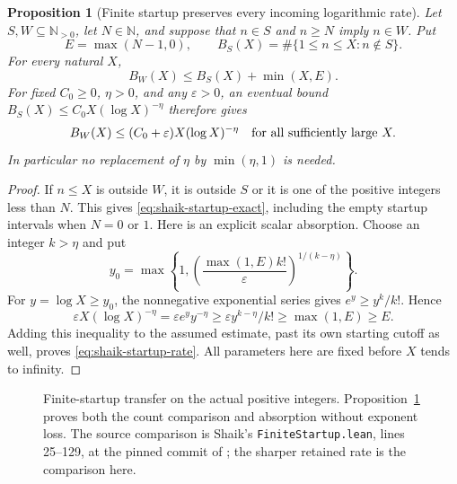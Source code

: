 \documentclass[11pt]{article}
\newtheorem{proposition}{Proposition}
\theoremstyle{remark}\newtheorem{remark}[proposition]{Remark}
\begin{document}
\begin{proposition}[Finite startup preserves every incoming logarithmic rate]
\label{prop:shaik-startup-rate}
Let \(S,W\subseteq\mathbb N_{>0}\), let \(N\in\mathbb N\), and suppose
that \(n\in S\) and \(n\ge N\) imply \(n\in W\). Put
\[
 E=\max(N-1,0),\qquad
 B_S(X)=\#\{1\le n\le X:n\notin S\}.
\]
For every natural \(X\),
\begin{equation}\label{eq:shaik-startup-exact}
 B_W(X)\le B_S(X)+\min(X,E).
\end{equation}
For fixed \(C_0\ge0\), \(\eta>0\), and any \(\varepsilon>0\), an
eventual bound \(B_S(X)\le C_0X(\log X)^{-\eta}\) therefore gives
\begin{equation}\label{eq:shaik-startup-rate}
 B_W(X)\le(C_0+\varepsilon)X(\log X)^{-\eta}
 \quad\hbox{for all sufficiently large }X.
\end{equation}
In particular no replacement of \(\eta\) by \(\min(\eta,1)\) is needed.
\end{proposition}
\begin{proof}
If \(n\le X\) is outside \(W\), it is outside \(S\) or it is
one of the positive integers less than \(N\). This gives
\eqref{eq:shaik-startup-exact}, including the empty startup intervals
when \(N=0\) or \(1\).
Here is an explicit scalar absorption. Choose an integer \(k>\eta\) and put
\[
 y_0=\max\left\{1,
 \left(\frac{\max(1,E)k!}{\varepsilon}\right)^{1/(k-\eta)}
 \right\}.
\]
For \(y=\log X\ge y_0\), the nonnegative exponential series gives
\(e^y\ge y^k/k!\). Hence
\[
 \varepsilon X(\log X)^{-\eta}
 =\varepsilon e^y y^{-\eta}
 \ge \varepsilon y^{k-\eta}/k!
 \ge \max(1,E)\ge E.
\]
Adding this inequality to the assumed estimate, past its own starting
cutoff as well, proves \eqref{eq:shaik-startup-rate}.
All parameters here are fixed before \(X\) tends to infinity.
\end{proof}

\begin{figure}[ht]
\centering
{}
\caption{Finite-startup transfer on the actual positive integers.
Proposition~\ref{prop:shaik-startup-rate} proves both the count comparison
and absorption without exponent loss. The source comparison is
Shaik's \texttt{FiniteStartup.lean}, lines 25--129, at the pinned commit
of \cite{Shaik2026v324}; the sharper retained rate is the comparison here.}
\end{figure}
\end{document}
